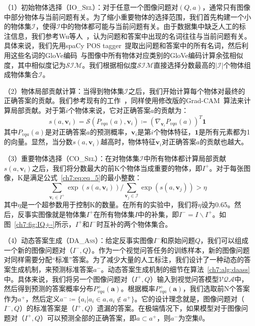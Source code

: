 （1）初始物体选择（\textsc{IO\_Sel}）：对于任意一个图像问题对$(Q, a)$，通常只有图像中部分物体与当前问题有关。为了缩小重要物体的选择范围，我们首先构建一个小的物体集$\mathcal{I}$，使得$\mathcal{I}$中的物体都可能与当前问题有关。由于数据集中缺乏人工的标注信息，我们参考Wu等人~\cite{wu2019self}，认为问题和答案中出现的名词往往与当前问题有关。具体来说，我们先用spaCy POS tagger~\cite{honnibal2017spacy}提取出问题和答案中的所有名词，然后利用这些名词的GloVe编码~\cite{pennington2014glove}与图像中所有物体对应类别的GloVe编码计算余弦相似度，其中相似度记为$\mathcal{SIM}$。我们根据相似度$\mathcal{SIM}$直接选择分数最高的$|\mathcal{I}|$个物体组成物体集合$\mathcal{I}$。

（2）物体局部贡献计算：当得到物体集$\mathcal{I}$之后，我们开始计算每个物体对最终的正确答案的贡献。我们参考现有的工作~\cite{jain2019attention,selvaraju2019taking,wu2019self}，同样使用修改版的Grad-CAM~\cite{selvaraju2017grad}算法来计算局部贡献。对于第$i$个物体来说，它对正确答案$a$的贡献为：
\begin{equation} \label{ch7:eq:eq_4}
s(a, \bm{v}_i) = \mathcal{S}(P_{vqa}(a), \bm{v}_i) \coloneqq (\nabla_{\bm{v}_i} P_{vqa}(a))^T\mathbf{1}
\end{equation}
其中$P_{vqa}(a)$是对正确答案$a$的预测概率，$\bm{v}_i$是第$i$个物体特征，$\mathbf{1}$是所有元素都为1的向量。显然，当分数$s(a, \bm{v}_i)$越高时，物体特征$\bm{v}_i$对正确答案$a$的贡献也越大。

（3）重要物体选择（\textsc{CO\_Sel}）：在对物体集$\mathcal{I}$中所有物体都计算局部贡献$s(a, \bm{v}_i)$之后，我们将分数最大的前K个物体当成重要的物体，即$I^+$。对于每张图像，K是满足公式~\eqref{ch7:eq:eq_5}的最小整数：
\begin{equation} \label{ch7:eq:eq_5}
\sum_{\bm{v}_i \in I^+} \exp(s(a, \bm{v}_i)) / \sum_{\bm{v}_j \in \mathcal{I}} \exp(s(a, \bm{v}_j))  > \eta
\end{equation}
其中$\eta$是一个超参数用于控制K的数量。在所有的实验中，我们将$\eta$设为0.65。然后，反事实图像就是物体集$I^+$在所有物体集$I$中的补集，即$I^- = I \backslash I^+$。如图~\ref{ch7:fig:IQ+-}所示，$I^+$和$I^-$时互补的两个物体集合。

（4）动态答案生成（\textsc{DA\_Ass}）：给定反事实图像$I^-$和原始问题$Q$，我们可以组成一个新的图像问题对（$I^-, Q$）。作为一个视觉问答任务的训练样本，新的图像问题对同样需要分配“标准”答案。为了减少大量的人工标注，我们设计了一种动态的答案生成机制，来预测标准答案$a^-$。动态答案生成机制的细节在算法~\ref{ch7:alg:daass}中。具体来说，我们将另一个图像问题对（$I^+, Q$）输入到视觉问答模型$\mathcal{VQA}$中，然后得到预测的答案概率分布$P^+_{vqa}(\bm{a})$。根据概率$P^+_{vqa}(\bm{a})$，我们选取前N个答案作为$a^+$，然后定义$ a^- \coloneqq \{a_i | a_i \in a, a_i \notin a^+ \}$。它的设计理念就是，图像问题对（$I^-, Q$）的标准答案是（$I^+, Q$）遗漏的答案。在极端情况下，如果模型对于图像问题对（$I^+, Q$）可以预测全部的正确答案，即$a \subset a^+$，则$a^-$为空集$\emptyset$。

